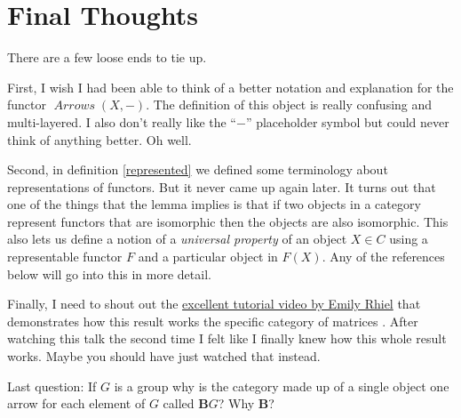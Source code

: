 \documentclass[12pt]{article}
\theoremstyle{definition}
\theoremstyle{definition}
\theoremstyle{definition}
\numberwithin{equation}{section}
\DeclareMathOperator{\Arrows}{\mathit{Arrows}}
\begin{document}
\section{Final Thoughts}

There are a few loose ends to tie up.

First, I wish I had been able to think of a better notation and explanation for the functor 
$\Arrows(X, -)$. The definition of this object is really confusing and multi-layered. 
I also don't really like the ``$-$'' placeholder symbol but could 
never think of anything better. Oh well.

Second, in definition \ref{represented} we defined some terminology about 
representations of functors. But 
it never came up again later. It turns out that one 
of the things that the lemma implies is that if two objects 
in a category represent functors that are isomorphic
then the objects are also isomorphic. This also lets us define a notion 
of a {\it universal property} of an object $X \in C$ 
using a representable functor $F$ and a particular object in $F(X)$.
Any of the references below will go into this in more detail.

Finally, I need to shout out the 
\href{https://www.youtube.com/watch?v=SsgEvrDFJsM}{excellent tutorial video by Emily Rhiel} 
that demonstrates how this result works
the specific category of matrices \cite{Rhiel2020}. After watching this talk the second time
I felt like I finally knew how this whole result works. Maybe you should have just watched that instead.

Last question: If $G$ is a group why is the category made up of a single object
one arrow for each element of $G$ called ${\mathbf B}G$? Why {\bf B}?

\newpage
\end{document}
